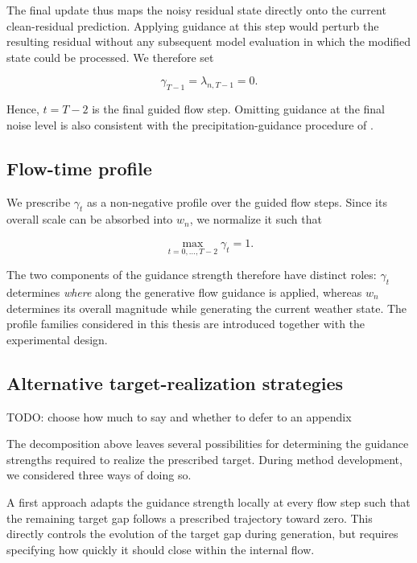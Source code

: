 The final update thus maps the noisy residual state directly onto the current
clean-residual prediction. Applying guidance at this step would perturb the
resulting residual without any subsequent model evaluation in which the
modified state could be processed. We therefore set

\begin{equation}
    \gamma_{T-1}
    =
    \lambda_{n,T-1}
    =
    0.
    \label{eq:no-final-guidance}
\end{equation}

Hence, $t=T-2$ is the final guided flow step. Omitting guidance at the final
noise level is also consistent with the precipitation-guidance procedure of
\textcite{ueyama2026guided}.


\subsection{Flow-time profile}

We prescribe $\gamma_t$ as a non-negative profile over the guided flow steps.
Since its overall scale can be absorbed into $w_n$, we normalize it such that

\begin{equation}
    \max_{t=0,\ldots,T-2}
    \gamma_t
    =
    1.
    \label{eq:guidance-profile-normalization}
\end{equation}

The two components of the guidance strength therefore have distinct roles:
$\gamma_t$ determines \emph{where} along the generative flow guidance is
applied, whereas $w_n$ determines its overall magnitude while generating the
current weather state. The profile families considered in this thesis are
introduced together with the experimental design.


\subsection{Alternative target-realization strategies}

TODO: choose how much to say and whether to defer to an appendix

The decomposition above leaves several possibilities for determining the
guidance strengths required to realize the prescribed target. During method
development, we considered three ways of doing so.

A first approach adapts the guidance strength locally at every flow step such
that the remaining target gap follows a prescribed trajectory toward zero.
This directly controls the evolution of the target gap during generation, but
requires specifying how quickly it should close within the internal flow.


